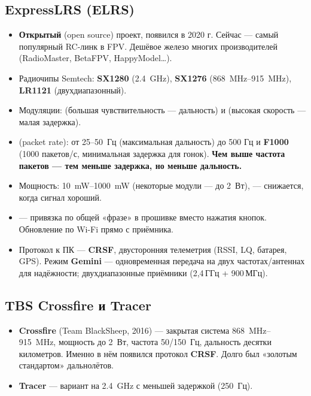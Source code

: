 \subsection{ExpressLRS (ELRS)}
\begin{itemize}
\item \textbf{Открытый} (open source) проект, появился в 2020 г. Сейчас — самый популярный RC-линк в FPV. Дешёвое железо многих производителей (RadioMaster, BetaFPV, HappyModel\ldots).
\item Радиочипы Semtech: \textbf{SX1280} (\SI{2.4}{\giga\hertz}), \textbf{SX1276} (\SIrange{868}{915}{\mega\hertz}), \textbf{LR1121} (двухдиапазонный).
\item Модуляции:  (большая чувствительность — дальность) и  (высокая скорость — малая задержка).
\item {} (packet rate): от 25–50~Гц (максимальная дальность) до 500 Гц и \textbf{F1000} (1000 пакетов/с, минимальная задержка для гонок). \textbf{Чем выше частота пакетов — тем меньше задержка, но меньше дальность.}
\item Мощность: \SIrange{10}{1000}{\milli\watt} (некоторые модули — до 2~Вт),  — снижается, когда сигнал хороший.
\item {} — привязка по общей «фразе» в прошивке вместо нажатия кнопок. Обновление по Wi-Fi прямо с приёмника.
\item Протокол к ПК — \textbf{CRSF}, двусторонняя телеметрия (RSSI, LQ, батарея, GPS). Режим \textbf{Gemini} — одновременная передача на двух частотах/антеннах для надёжности; двухдиапазонные приёмники (2,4\,ГГц + 900\,МГц).
\end{itemize}

\subsection{TBS Crossfire и Tracer}
\begin{itemize}
\item \textbf{Crossfire} (Team BlackSheep, 2016) — закрытая система \SIrange{868}{915}{\mega\hertz}, мощность до 2~Вт, частота 50/150~Гц, дальность десятки километров. Именно в нём появился протокол \textbf{CRSF}. Долго был «золотым стандартом» дальнолётов.
\item \textbf{Tracer} — вариант на \SI{2.4}{\giga\hertz} с меньшей задержкой (250~Гц).
\end{itemize}

